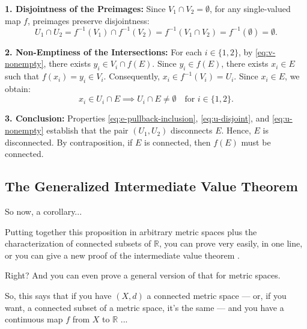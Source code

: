 \begin{proofWrapper}
\begin{content}
\textbf{1. Disjointness of the Preimages:}
Since $V_1 \cap V_2 = \emptyset$, for any single-valued map $f$, preimages preserve disjointness:
\begin{equation}\label{eq:u-disjoint}
U_1 \cap U_2 = f^{-1}(V_1) \cap f^{-1}(V_2) = f^{-1}(V_1 \cap V_2) = f^{-1}(\emptyset) = \emptyset.
\end{equation}

\textbf{2. Non-Emptiness of the Intersections:}
For each $i \in \{1, 2\}$, by \eqref{eq:v-nonempty}, there exists $y_i \in V_i \cap f(E)$.
Since $y_i \in f(E)$, there exists $x_i \in E$ such that $f(x_i) = y_i \in V_i$.
Consequently, $x_i \in f^{-1}(V_i) = U_i$. Since $x_i \in E$, we obtain:
\begin{equation}\label{eq:u-nonempty}
x_i \in U_i \cap E \implies U_i \cap E \neq \emptyset \quad \text{for } i \in \{1, 2\}.
\end{equation}

\textbf{3. Conclusion:}
Properties \eqref{eq:e-pullback-inclusion}, \eqref{eq:u-disjoint}, and \eqref{eq:u-nonempty} establish that the pair $(U_1, U_2)$ disconnects $E$.
Hence, $E$ is disconnected.
By contraposition, if $E$ is connected, then $f(E)$ must be connected.
\end{content}

\end{proofWrapper}

\subsection{The Generalized Intermediate Value Theorem}

\begin{speech}[00:28:02 - 00:29:22]
So now, a corollary...


Putting together this proposition in arbitrary metric spaces plus the characterization of connected subsets of $\mathbb{R}$, you can prove very easily, in one line, or you can give a new proof of the intermediate value theorem .

Right? And you can even prove a general version of that for metric spaces.

So, this says that if you have $(X, d)$ a connected metric space  --- or, if you want, a connected subset of a metric space, it's the same --- and you have a continuous map $f$ from $X$ to $\mathbb{R}$ ...
\end{speech}

